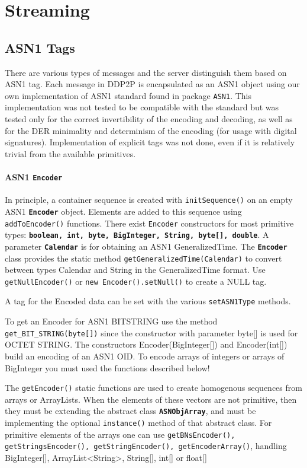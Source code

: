 \documentclass{book}
\newcommand{\pkg}[1]{{\tt #1}}
\newcommand{\cls}[1]{{\tt\bf #1}}
\newcommand{\mth}[1]{{\tt #1}}
\begin{document}
\section{Streaming}

\subsection{ASN1 Tags}
There are various types of messages and the server distinguish them based on ASN1 tag. Each message in DDP2P is
encapsulated as an ASN1 object using our own implementation of ASN1 standard found in package \pkg{ASN1}.
This implementation was not tested to be compatible with the standard but was tested only for the correct invertibility of the
encoding and decoding, as well as for the DER minimality and determinism of the encoding (for usage with digital signatures).
Implementation of explicit tags was not done, even if it is relatively trivial from the available primitives.

\paragraph{ASN1 \cls{Encoder}}
In principle, a container sequence is created with \mth{initSequence()} on an empty ASN1 \cls{Encoder} object.
Elements are added to this sequence using \mth{addToEncoder()} functions. There exist \mth{Encoder} constructors for
most primitive types: \cls{boolean, int, byte, BigInteger, String, byte[], double}. A parameter 
\cls{Calendar} is for obtaining an ASN1 GeneralizedTime. The \cls{Encoder} class provides the static method \mth{getGeneralizedTime(Calendar)}
to convert between types Calendar and String in the GeneralizedTime format.
Use \mth{getNullEncoder()} or \mth{new Encoder().setNull()} to create a NULL tag.


A tag for the Encoded data can be set with the various \mth{setASN1Type} methods.

To get an Encoder for ASN1 BITSTRING use the method \mth{get\_BIT\_STRING(byte[])} since the constructor
with parameter byte[] is used for OCTET STRING.
The constructors Encoder(BigInteger[]) and Encoder(int[]) build an encoding of an ASN1 OID. To encode
arrays of integers or arrays of BigInteger you must used the functions described below!

The \mth{getEncoder()} static functions are used to create homogenous sequences from arrays or ArrayLists.
When the elements of these vectors are not primitive, then they must be extending the abstract class \cls{ASNObjArray},
and must be implementing the optional \mth{instance()} method of that abstract class.
For primitive elements of the arrays one can use \mth{getBNsEncoder(), getStringsEncoder(), getStringEncoder(), 
getEncoderArray()}, handling BigInteger[], ArrayList<String>, String[], int[] or float[]
\end{document}
